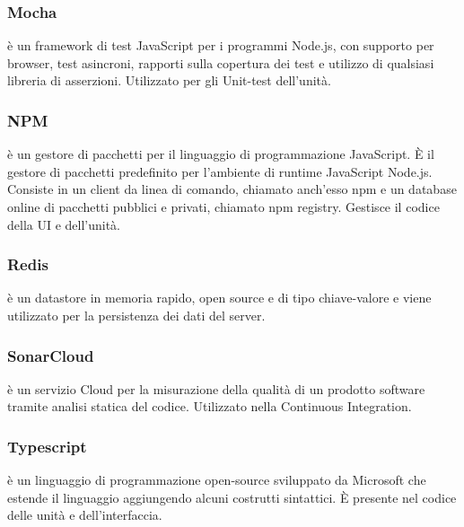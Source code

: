 	\subsubsection{Mocha}
	 è un framework di test JavaScript per i programmi Node.js, con supporto per browser, test asincroni, rapporti sulla copertura dei test e utilizzo di qualsiasi libreria di asserzioni. Utilizzato per gli Unit-test dell'unità.
	
	\subsubsection{NPM}
	 è un gestore di pacchetti per il linguaggio di programmazione JavaScript. È il gestore	di pacchetti predefinito per l’ambiente di runtime JavaScript Node.js. Consiste in un client da linea di comando, chiamato anch’esso npm e un database online di pacchetti pubblici e privati, chiamato npm registry. Gestisce il codice della UI e dell'unità.
	
	\subsubsection{Redis}
	 è un datastore in memoria rapido, open source e di tipo chiave-valore e viene utilizzato per la persistenza dei dati del server.
	
	\subsubsection{SonarCloud}
	 è un servizio Cloud per la misurazione della qualità di un prodotto software tramite analisi statica del codice. Utilizzato nella Continuous Integration.

	\subsubsection{Typescript}
	 è un linguaggio di programmazione open-source sviluppato da Microsoft che estende il linguaggio  aggiungendo alcuni costrutti sintattici. È presente nel codice delle unità e dell'interfaccia.
